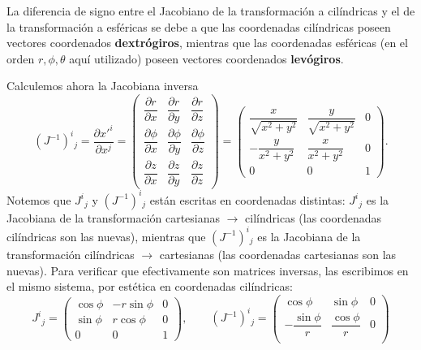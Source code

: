 \begin{observacion}
La diferencia de signo entre el Jacobiano de la transformación a cilíndricas y el de la transformación a esféricas se debe a que las coordenadas cilíndricas poseen vectores coordenados \textbf{dextrógiros}, mientras que las coordenadas esféricas (en el orden $r,\phi,\theta$ aquí utilizado) poseen vectores coordenados \textbf{levógiros}.
\end{observacion}

\begin{ejemplo}
Calculemos ahora la Jacobiana inversa
\begin{equation}
(J^{-1})^i{}_j = \frac{\partial x'^i}{\partial x^j} =
\begin{pmatrix}
\dfrac{\partial r}{\partial x} & \dfrac{\partial r}{\partial y} & \dfrac{\partial r}{\partial z} \\[6pt]
\dfrac{\partial \phi}{\partial x} & \dfrac{\partial \phi}{\partial y} & \dfrac{\partial \phi}{\partial z} \\[6pt]
\dfrac{\partial z}{\partial x} & \dfrac{\partial z}{\partial y} & \dfrac{\partial z}{\partial z}
\end{pmatrix}
=
\begin{pmatrix}
\dfrac{x}{\sqrt{x^2+y^2}} & \dfrac{y}{\sqrt{x^2+y^2}} & 0 \\[8pt]
-\dfrac{y}{x^2+y^2} & \dfrac{x}{x^2+y^2} & 0 \\[8pt]
0 & 0 & 1
\end{pmatrix}.
\end{equation}
Notemos que $J^i{}_j$ y $(J^{-1})^i{}_j$ están escritas en coordenadas distintas: $J^i{}_j$ es la Jacobiana de la transformación cartesianas $\to$ cilíndricas (las coordenadas cilíndricas son las nuevas), mientras que $(J^{-1})^i{}_j$ es la Jacobiana de la transformación cilíndricas $\to$ cartesianas (las coordenadas cartesianas son las nuevas). Para verificar que efectivamente son matrices inversas, las escribimos en el mismo sistema, por estética en coordenadas cilíndricas:
\begin{equation}
J^i{}_j =
\begin{pmatrix}
\cos\phi & -r\sin\phi & 0 \\
\sin\phi & r\cos\phi & 0 \\
0 & 0 & 1
\end{pmatrix},
\qquad
(J^{-1})^i{}_j =
\begin{pmatrix}
\cos\phi & \sin\phi & 0 \\
-\dfrac{\sin\phi}{r} & \dfrac{\cos\phi}{r} & 0 \\[6pt]

\end{pmatrix}
\end{equation}
\end{ejemplo}
